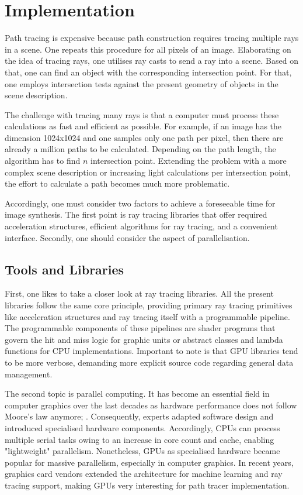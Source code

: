 \chapter{Implementation}

Path tracing is expensive because path construction requires tracing multiple rays in a scene.
One repeats this procedure for all pixels of an image.
Elaborating on the idea of tracing rays, one utilises ray casts to send a ray into a scene. 
Based on that, one can find an object with the corresponding intersection point.
For that, one employs intersection tests against the present geometry of objects in the scene description.

The challenge with tracing many rays is that a computer must process these calculations as fast and efficient as possible.
For example, if an image has the dimension 1024x1024 and one samples only one path per pixel, then there are already a million paths to be calculated. 
Depending on the path length, the algorithm has to find $n$ intersection point.
Extending the problem with a more complex scene description or increasing light calculations per intersection point, the effort to calculate a path becomes much more problematic.

Accordingly, one must consider two factors to achieve a foreseeable time for image synthesis.
The first point is ray tracing libraries that offer required acceleration structures, efficient algorithms for ray tracing, and a convenient interface.
Secondly, one should consider the aspect of parallelisation.

\section{Tools and Libraries}

First, one likes to take a closer look at ray tracing libraries.
All the present libraries follow the same core principle, providing primary ray tracing primitives like acceleration structures and ray tracing itself with a programmable pipeline.
The programmable components of these pipelines are shader programs that govern the hit and miss logic for graphic units or abstract classes and lambda functions for CPU implementations.
Important to note is that GPU libraries tend to be more verbose, demanding more explicit source code regarding general data management.

The second topic is parallel computing.
It has become an essential field in computer graphics over the last decades as hardware performance does not follow Moore's law anymore; \cite{theis_end_2017}.
Consequently, experts adapted software design and introduced specialised hardware components.
Accordingly, CPUs can process multiple serial tasks owing to an increase in core count and cache, enabling "lightweight" parallelism.
Nonetheless, GPUs as specialised hardware became popular for massive parallelism, especially in computer graphics.
In recent years, graphics card vendors extended the architecture for machine learning and ray tracing support, making GPUs very interesting for path tracer implementation.

